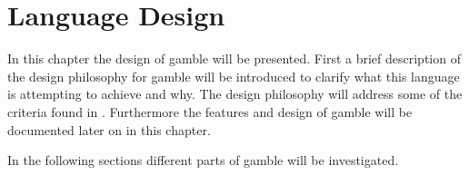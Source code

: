 \chapter{Language Design}
\label{cha:language_design}
In this chapter the design of \gls{gamble} will be presented.
First a brief description of the design philosophy for \gls{gamble} will be introduced to clarify what this language is attempting to achieve and why.
The design philosophy will address some of the criteria found in .
Furthermore the features and design of \gls{gamble} will be documented later on in this chapter.



In the following sections different parts of \gls{gamble} will be investigated.











